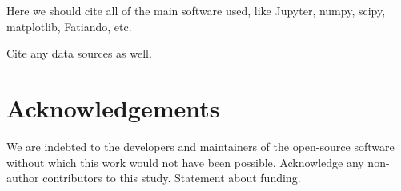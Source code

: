 Here we should cite all of the main software used, like Jupyter, numpy, scipy,
matplotlib, Fatiando, etc.

Cite any data sources as well.



\section{Acknowledgements}

We are indebted to the developers and maintainers of the open-source software
without which this work would not have been possible.
Acknowledge any non-author contributors to this study.
Statement about funding.

